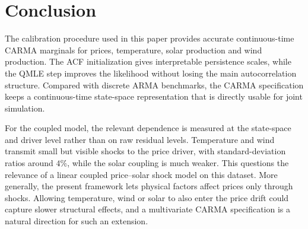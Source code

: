 \section{Conclusion}\label{sec:conclusion}

The calibration procedure used in this paper provides accurate continuous-time
CARMA marginals for prices, temperature, solar production and wind production.
The ACF initialization gives interpretable persistence scales, while the QMLE
step improves the likelihood without losing the main autocorrelation structure.
Compared with discrete ARMA benchmarks, the CARMA specification keeps a
continuous-time state-space representation that is directly usable for joint
simulation.

For the coupled model, the relevant dependence is measured at the state-space
and driver level rather than on raw residual levels. Temperature and wind
transmit small but visible shocks to the price driver, with standard-deviation
ratios around \(4\%\), while the solar coupling is much weaker. This questions
the relevance of a linear coupled price--solar shock model on this dataset. More
generally, the present framework lets physical factors affect prices only
through shocks. Allowing temperature, wind or solar to also enter the price
drift could capture slower structural effects, and a multivariate CARMA
specification is a natural direction for such an extension.
